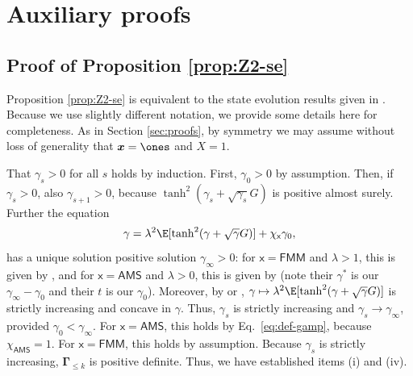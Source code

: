 \documentclass[]{article}
\def\sx{{\mathsf x}}
\def\bGamma{\boldsymbol{\Gamma}}
\def\bx{{\boldsymbol x}}
\def\bx{{\boldsymbol x}}
\def\FMM{\mathsf{FMM}}
\def\AMS{\mathsf{AMS}}
\begin{document}
\section{Auxiliary proofs}

\subsection{Proof of Proposition \ref{prop:Z2-se}}

Proposition \ref{prop:Z2-se} is equivalent to the state evolution results given in \cite{deshpande2016,celentanoFanMei2021,AlaouiMontanariSelke2022}.
Because we use slightly different notation,
we provide some details here for completeness.
As in Section \ref{sec:proofs},
by symmetry we may assume without loss of generality that $\bx = \ones$ and $X = 1$.

That $\gamma_s > 0$ for all $s$ holds by induction.
First, $\gamma_0 > 0$ by assumption. Then, if $ \gamma_s > 0$,
also $\gamma_{s+1} > 0$, because $\tanh^2(\gamma_s + \sqrt{\gamma_s}G)$ is positive almost surely.
Further the equation 
\begin{equation}
    \gamma = \lambda^2 \E[\tanh^2(\gamma + \sqrt{\gamma}G)] + \chi_{\sx} \gamma_0,        
\end{equation}
has a unique solution positive solution $\gamma_\infty > 0$:
for $\sx = \FMM$ and $\lambda > 1$, this is given by \cite[Proposition A.2]{celentanoFanMei2021}, and for $\sx = \AMS$ and $\lambda > 0$, this is given by \cite[Lemma 4.5]{AlaouiMontanariSelke2022} (note their $\gamma^*$ is our $\gamma_\infty - \gamma_0$ and their $t$ is our $\gamma_0$).
Moreover, by \cite[Lemma 6.1(a)]{deshpande2016} or \cite[Lemma 4.5(a)]{AlaouiMontanariSelke2022},
$\gamma \mapsto \lambda^2 \E[\tanh^2(\gamma + \sqrt{\gamma}G)]$ is strictly increasing and concave in $\gamma$.
Thus, $\gamma_s$ is strictly increasing and $\gamma_s \rightarrow \gamma_\infty$, provided $\gamma_0 < \gamma_\infty$. 
For $\sx = \AMS$, 
this holds by Eq.~\eqref{eq:def-gamp}, because $\chi_{\AMS} = 1$.
For $\sx = \FMM$, 
this holds by assumption.
Because $\gamma_s$ is strictly increasing, $\bGamma_{\leq k}$ is positive definite.
Thus, we have established items (i) and (iv).
\end{document}
